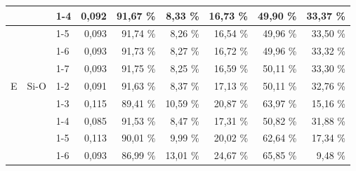 \documentclass[
  digital, %
  table,   %
  lof,     %
  lot,     %
  oneside,
]{fithesis3}
\begin{document}
\begin{table}
\begin{minipage}{\textwidth}
\begin{center}
\begin{tabular}{|l|l|l|r|r|r|r|r|r|}
 &  & 1-4  & 0,092 & 91,67 \% & 8,33 \% & 16,73 \% & 49,90 \% & 33,37 \% \\ \hline
 &  & 1-5  & 0,093 & 91,74 \% & 8,26 \% & 16,54 \% & 49,96 \% & 33,50 \% \\ \hline
 &  & 1-6 & 0,093 & 91,73 \% & 8,27 \% & 16,72 \% & 49,96 \% & 33,32 \% \\ \hline
 &  & 1-7 & 0,093 & 91,75 \% & 8,25 \% & 16,59 \% & 50,11 \% & 33,30 \% \\ \hline
E & Si-O & 1-2  & 0,091 & 91,63 \% & 8,37 \% & 17,13 \% & 50,11 \% & 32,76 \% \\ \hline
 &  & 1-3  & 0,115 & 89,41 \% & 10,59 \% & 20,87 \% & 63,97 \% & 15,16 \% \\ \hline
 &  & 1-4  & 0,085 & 91,53 \% & 8,47 \% & 17,31 \% & 50,82 \% & 31,88 \% \\ \hline
 &  & 1-5  & 0,113 & 90,01 \% & 9,99 \% & 20,02 \% & 62,64 \% & 17,34 \% \\ \hline
 &  & 1-6 & 0,093 & 86,99 \% & 13,01 \% & 24,67 \% & 65,85 \% & 9,48 \% \\ \hline
\end{tabular}\end{center}\end{minipage}\end{table}
\end{document}
